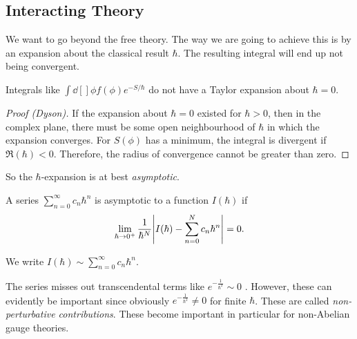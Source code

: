 
\subsection{Interacting Theory}%
\label{sub:interacting_theory}

We want to go beyond the free theory.
The way we are going to achieve this is by an expansion about the classical result $\hbar$.
The resulting integral will end up not being convergent.

\begin{claim}
  Integrals like $ \int \dd[]{\phi} f(\phi) e^{- S / \hbar} $ do not have a Taylor expansion about $\hbar = 0$.
\end{claim}
\begin{proof}[Proof (Dyson)]
  If the expansion about $\hbar = 0$ existed for $\hbar > 0$, then in the complex plane, there must be some open neighbourhood of $\hbar$ in which the expansion converges.
  For $S(\phi)$ has a minimum, the integral is divergent if $\Re (\hbar)< 0$.
  Therefore, the radius of convergence cannot be greater than zero.
\end{proof}

So the $\hbar$-expansion is at best \emph{asymptotic}.
\begin{definition}[asymptotic]
  A series $\sum_{n = 0}^{\infty} c_n \hbar^n$  is asymptotic to a function $I(\hbar)$ if
  \begin{equation}
    \lim_{\hbar \to 0^+} \frac{1}{\hbar^N} \abs{I(\hbar) - \sum_{n=0}^N c_n \hbar^n} = 0.
  \end{equation} 
\end{definition}
\begin{notation}[]
  We write $I(\hbar) \sim \sum_{n=0}^{\infty} c_n \hbar^n$.
\end{notation}

The series misses out transcendental terms like $e^{-\frac{1}{\hbar^2}} \sim 0$ . However, these can evidently be important since obviously $e^{-\frac{1}{\hbar^2}} \neq 0$  for finite $\hbar$. These are called  \emph{non-perturbative contributions}. These become important in particular for non-Abelian gauge theories.

